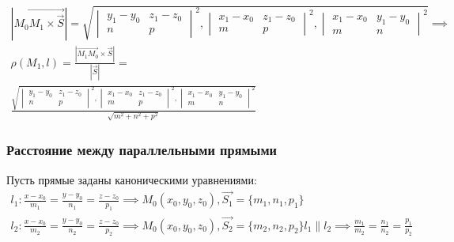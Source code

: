 \begin{gather*}
  \\
  |\overrightarrow{M_0M_1 \times \vec{S}}| = 
  \sqrt{
  \begin{vmatrix}
    y_1 - y_0 & z_1 - z_0 \\
    n & p
  \end{vmatrix}^2,
  \begin{vmatrix}
    x_1 - x_0 & z_1 - z_0 \\
    m & p
  \end{vmatrix}^2, 
  \begin{vmatrix}
    x_1 - x_0 & y_1 - y_0 \\
    m & n
  \end{vmatrix}^2
  } \implies \\
  \rho(M_1, l) = 
  \frac{|\overrightarrow{M_1M_0} \times \vec{S}|}{|\vec{S}|} = \\
  \boxed{\frac{\sqrt{
  \begin{vmatrix}
    y_1 - y_0 & z_1 - z_0 \\
    n & p
  \end{vmatrix}^2,
  \begin{vmatrix}
    x_1 - x_0 & z_1 - z_0 \\
    m & p
  \end{vmatrix}^2, 
  \begin{vmatrix}
    x_1 - x_0 & y_1 - y_0 \\
    m & n
  \end{vmatrix}^2
  }}{\sqrt{m^2 + n^2 + p^2} }} 
\end{gather*}

\subsubsection{Расстояние между параллельными прямыми}

Пусть прямые заданы каноническими уравнениями:
\begin{gather*}
  l_1: \frac{x - x_0}{m_1} = \frac{y - y_0}{n_1} = \frac{z - z_0}{p_1} \implies M_0(x_0, y_0, z_0), \vec{S_1} = \{m_1, n_1, p_1\} \\
  l_2: \frac{x - x_0}{m_2} = \frac{y - y_0}{n_2} = \frac{z - z_0}{p_2} \implies M_0(x_0, y_0, z_0), \vec{S_2} = \{m_2, n_2, p_2\}
  l_1 \parallel l_2 \implies \frac{m_1}{m_2} = \frac{n_1}{n_2} = \frac{p_1}{p_2}
\end{gather*}

